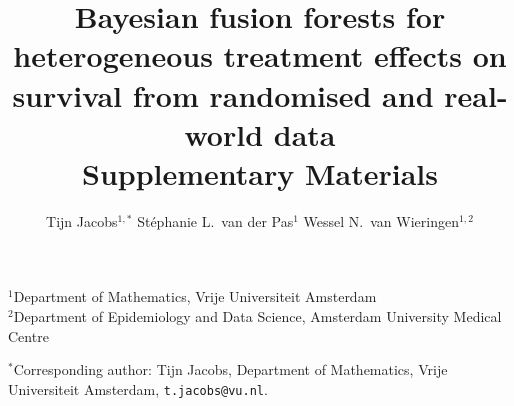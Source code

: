 \documentclass[11pt]{article}
\title{Bayesian fusion forests for heterogeneous treatment effects on
  survival from randomised and real-world data\\[0.4em]
   Supplementary Materials}
\author{
  Tijn Jacobs$^{1,\ast}$ \quad
  St\'ephanie L.\ van der Pas$^{1}$ \quad
  Wessel N.\ van Wieringen$^{1, 2}$
}
\date{}
\theoremstyle{plain}
\theoremstyle{definition}
\theoremstyle{remark}
\newcommand{\1}{\mathds{1}}
\begin{document}
\makeatletter
{}
\makeatother

\maketitle

\begin{center}
\begin{minipage}{0.9\textwidth}
\setlength{\parskip}{0.4em}
\small
\noindent
$^{1}$Department of Mathematics, Vrije Universiteit Amsterdam \\
$^{2}$Department of Epidemiology and Data Science, Amsterdam University Medical Centre

\noindent
$^{\ast}$Corresponding author: Tijn Jacobs, Department of Mathematics, Vrije
Universiteit Amsterdam, \texttt{t.jacobs@vu.nl}.
\end{minipage}
\end{center}

\FloatBarrier



% 






\clearpage


\end{document}
